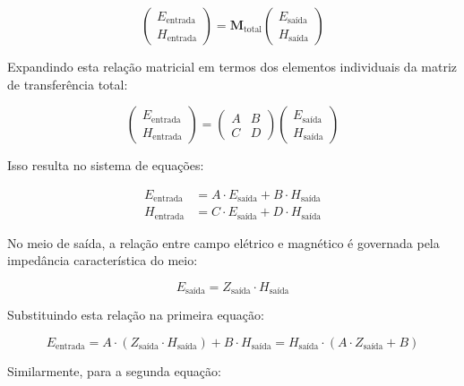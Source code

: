 \documentclass[11pt,a4paper]{article}
\begin{document}
\begin{equation}
\begin{pmatrix}
E_{\text{entrada}} \\
H_{\text{entrada}}
\end{pmatrix} = \mathbf{M}_{\text{total}} \begin{pmatrix}
E_{\text{saída}} \\
H_{\text{saída}}
\end{pmatrix}
\end{equation}

Expandindo esta relação matricial em termos dos elementos individuais da matriz de transferência total:

\begin{equation}
\begin{pmatrix}
E_{\text{entrada}} \\
H_{\text{entrada}}
\end{pmatrix} = \begin{pmatrix}
A & B \\
C & D
\end{pmatrix} \begin{pmatrix}
E_{\text{saída}} \\
H_{\text{saída}}
\end{pmatrix}
\end{equation}

Isso resulta no sistema de equações:

\begin{align}
E_{\text{entrada}} &= A \cdot E_{\text{saída}} + B \cdot H_{\text{saída}} \\
H_{\text{entrada}} &= C \cdot E_{\text{saída}} + D \cdot H_{\text{saída}}
\end{align}

No meio de saída, a relação entre campo elétrico e magnético é governada pela impedância característica do meio:

\begin{equation}
E_{\text{saída}} = Z_{\text{saída}} \cdot H_{\text{saída}}
\end{equation}

Substituindo esta relação na primeira equação:

\begin{equation}
E_{\text{entrada}} = A \cdot (Z_{\text{saída}} \cdot H_{\text{saída}}) + B \cdot H_{\text{saída}} = H_{\text{saída}} \cdot (A \cdot Z_{\text{saída}} + B)
\end{equation}

Similarmente, para a segunda equação:
\end{document}
